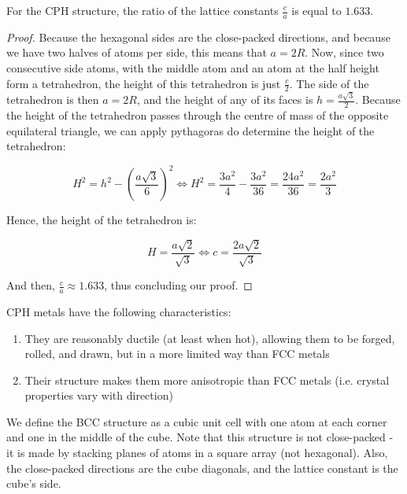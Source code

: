 \documentclass{article}
\begin{document}
\begin{proposition}
    For the CPH structure, the ratio of the lattice constants $\frac{c}{a}$ is equal to $1.633$.
\end{proposition}

\begin{proof}
    Because the hexagonal sides are the close-packed directions, and because we have two halves of atoms per side, this means that $a = 2R$. Now, since two consecutive side atoms, with the middle atom and an atom at the half height form a tetrahedron, the height of this tetrahedron is just $\frac{c}{2}$. The side of the tetrahedron is then $a = 2R$, and the height of any of its faces is $h = \frac{a\sqrt{3}}{2}$. Because the height of the tetrahedron passes through the centre of mass of the opposite equilateral triangle, we can apply pythagoras do determine the height of the tetrahedron:

    \[ H^2 = h^2 - \left(\frac{a\sqrt{3}}{6}\right)^2 \iff H^2 = \frac{3a^2}{4} - \frac{3a^2}{36} = \frac{24a^2}{36} = \frac{2a^2}{3}\]

    Hence, the height of the tetrahedron is:

    \[ H = \frac{a\sqrt{2}}{\sqrt{3}} \iff c = \frac{2a\sqrt{2}}{\sqrt{3}} \]

    And then, $\frac{c}{a} \approx 1.633$, thus concluding our proof.
\end{proof}

CPH metals have the following characteristics:

\begin{enumerate}
    \item They are reasonably ductile (at least when hot), allowing them to be forged, rolled, and drawn, but in a more limited way than FCC metals
    \item Their structure makes them more anisotropic than FCC metals (i.e. crystal properties vary with direction)
\end{enumerate}

\begin{definition}
    We define the BCC structure as a cubic unit cell with one atom at each corner and one in the middle of the cube. Note that this structure is not close-packed - it is made by stacking planes of atoms in a square array (not hexagonal). Also, the close-packed directions are the cube diagonals, and the lattice constant is the cube's side.
\end{definition}
    
\end{document}
